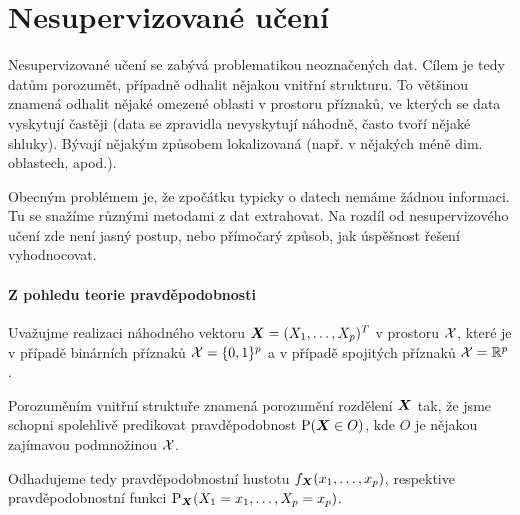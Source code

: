 \section{Nesupervizované učení}

Nesupervizované učení se zabývá problematikou neoznačených dat. Cílem je tedy datům porozumět, případně odhalit nějakou vnitřní strukturu. To většinou znamená odhalit nějaké omezené oblasti v prostoru příznaků, ve kterých se data vyskytují častěji (data se zpravidla nevyskytují náhodně, často tvoří nějaké shluky). Bývají nějakým způsobem lokalizovaná (např. v nějakých méně dim. oblastech, apod.).

Obecným problémem je, že zpočátku typicky o datech nemáme žádnou informaci. Tu se snažíme různými metodami z dat extrahovat. Na rozdíl od nesupervizového učení zde není jasný postup, nebo přímočarý způsob, jak úspěšnost řešení vyhodnocovat.

\paragraph{Z pohledu teorie pravděpodobnosti} Uvažujme realizaci náhodného vektoru $\bm{X} = (X_1, \ldots, X_p)^T$ v prostoru $\mathcal{X}$, které je v případě binárních příznaků $\mathcal{X} = \{0,1\}^p$ a v případě spojitých příznaků $\mathcal{X} = \mathbb{R}^p$.

Porozuměním vnitřní struktuře znamená porozumění rozdělení $\bm{X}$ tak, že jsme schopni spolehlivě predikovat pravděpodobnost $\text{P}(\bm{X} \in O)$, kde $O$ je nějakou zajímavou podmnožinou $\mathcal{X}$.

Odhadujeme tedy pravděpodobnostní hustotu $f_{\bm{X}}(x_1, \ldots, x_p)$, respektive pravděpodobnostní funkci $\text{P}_{\bm{X}}(X_1 = x_1, \ldots, X_p = x_p)$.
